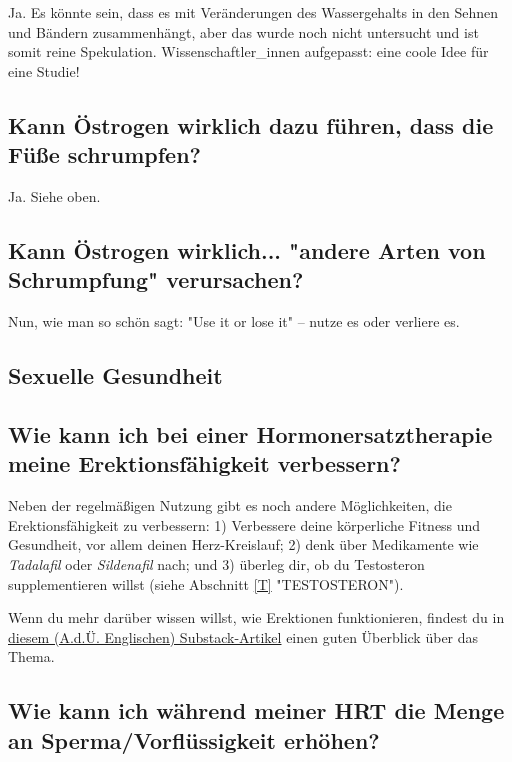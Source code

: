 \documentclass{article}
\begin{document}
Ja. Es könnte sein, dass es mit Veränderungen des Wassergehalts in den Sehnen und Bändern zusammenhängt, aber das wurde noch nicht untersucht und ist somit reine Spekulation. Wissenschaftler\_innen aufgepasst: eine coole Idee für eine Studie!

\subsection{Kann Östrogen wirklich dazu führen, dass die Füße schrumpfen?}

Ja. Siehe oben.

\subsection{Kann Östrogen wirklich... "andere Arten von Schrumpfung" verursachen?}

Nun, wie man so schön sagt: "Use it or lose it" – nutze es oder verliere es.

\subsection*{Sexuelle Gesundheit}

\subsection{Wie kann ich bei einer Hormonersatztherapie meine Erektionsfähigkeit verbessern?}\label{11-20}

Neben der regelmäßigen Nutzung gibt es noch andere Möglichkeiten, die Erektionsfähigkeit zu verbessern: 1) Verbessere deine körperliche Fitness und Gesundheit, vor allem deinen Herz-Kreislauf; 2) denk über Medikamente wie \textit{Tadalafil} oder \textit{Sildenafil} nach; und 3) überleg dir, ob du Testosteron supplementieren willst (siehe Abschnitt \ref{T} "TESTOSTERON").

Wenn du mehr darüber wissen willst, wie Erektionen funktionieren, findest du in \href{https://stainedglasswoman.substack.com/p/how-to-maintain-your-penis-function}{diesem (A.d.Ü. Englischen) Substack-Artikel} einen guten Überblick über das Thema.

\subsection{Wie kann ich während meiner HRT die Menge an Sperma/Vorflüssigkeit erhöhen?}
\end{document}
